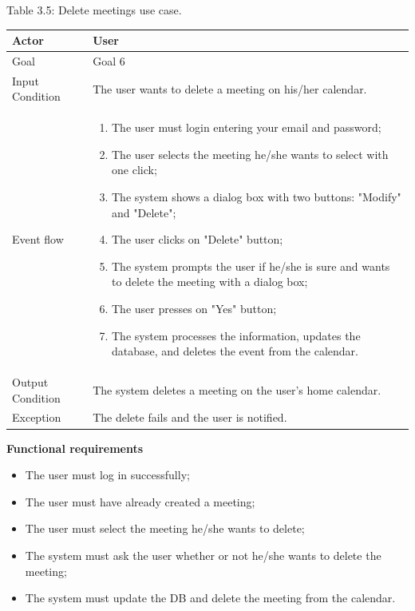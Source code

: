 \documentclass{article}
\begin{document}
	\begin{center}
		Table 3.5: Delete meetings use case.
		
		\bigskip
    		\begin{tabular}{p{}|p{}}
   		 	\hline
    			Actor & User \\ \hline
    			Goal & Goal 6 \\ \hline
    			Input Condition & The user wants to delete a meeting on his/her calendar. \\ \hline
    			Event flow & 
			\begin{enumerate}
  				\item The user must login entering your email and password;
  				\item The user selects the meeting he/she wants to select with one click;
  				\item The system shows a dialog box with two buttons: "Modify" and "Delete";
  				\item The user clicks on "Delete" button;
  				\item The system prompts the user if he/she is sure and wants to delete the meeting with a dialog box;
  				\item The user presses on "Yes" button;
  				\item The system processes the information, updates the database, and deletes the event from the calendar.
 			 \end{enumerate} \\ \hline
    			Output Condition & The system deletes a meeting on the user's home calendar. \\ \hline
    			Exception & The delete fails and the user is notified. \\ \hline
    		\end{tabular}
	\end{center}
	
	\bigskip
	\noindent
	\textbf{Functional requirements} \\
	\begin{itemize}
		\item The user must log in successfully;
		\item The user must have already created a meeting;
		\item The user must select the meeting he/she wants to delete;
		\item The system must ask the user whether or not he/she wants to delete the meeting;
		\item The system must update the DB and delete the meeting from the calendar.
	\end{itemize}
	
\end{document}
